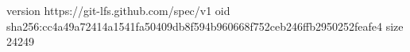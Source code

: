version https://git-lfs.github.com/spec/v1
oid sha256:cc4a49a72414a1541fa50409db8f594b960668f752ceb246ffb2950252feafe4
size 24249
